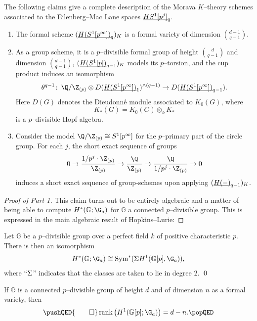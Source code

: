 \begin{theorem}\label{MainKThyOfEMSpacesTheorem}
The following claims give a complete description of the Morava \(K\)--theory schemes associated to the Eilenberg--Mac Lane spaces \(\OS{HS^1[p^j]}{q}\).
\begin{enumerate}
    \item The formal scheme \((\OS{H(S^1[p^\infty])}{q})_K\) is a formal variety of dimension \(\binom{d-1}{q-1}\).
    \item As a group scheme, it is a \(p\)--divisible formal group of height \(\binom{d}{q-1}\) and dimension \(\binom{d-1}{q-1}\), \((\OS{H(S^1[p])}{q-1})_K\) models its \(p\)--torsion, and the cup product induces an isomorphism \[\theta^{q-1}\co \Q / \Z_{(p)} \otimes D(\OS{H(S^1[p^\infty])}{1})^{\wedge (q-1)} \to D(\OS{H(S^1[p^\infty])}{q-1}).\]
          Here \(D(G)\) denotes the Dieudonn\'e module associated to \(K_0(G)\), where \[K_*(G) = K_0(G) \otimes_k K_*\] is a \(p\)--divisible Hopf algebra.
    \item Consider the model \(\Q / \Z_{(p)} \cong S^1[p^\infty]\) for the \(p\)--primary part of the circle group.
          For each \(j\), the short exact sequence of groups \[0 \to \frac{1/p^j \cdot \Z_{(p)}}{\Z_{(p)}} \to \frac{\Q}{\Z_{(p)}} \to \frac{\Q}{1/p^j \cdot \Z_{(p)}} \to 0\] induces a short exact sequence of group-schemes upon applying \((\OS{H(-)}{q-1})_K\).
\end{enumerate}
\end{theorem}
\begin{proof}[Proof of Part 1]\renewcommand{\qedsymbol}{\relax}
This claim turns out to be entirely algebraic and a matter of being able to compute \(H^*(\mathbb G; \G_a)\) for \(\mathbb G\) a connected \(p\)--divisible group.
This is expressed in the main algebraic result of Hopkins--Lurie:
\end{proof}

\begin{theorem}
Let \(\mathbb G\) be a \(p\)--divisible group over a perfect field \(k\) of positive characteristic \(p\).
There is then an isomorphism \[H^*(\mathbb G; \G_a) \cong \Sym^*(\Susp H^1(\mathbb G[p], \G_a)),\] where ``\(\Sigma\)'' indicates that the classes are taken to lie in degree \(2\). \qed
\end{theorem}

\begin{lemma}
If \(\mathbb G\) is a connected \(p\)--divisible group of height \(d\) and of dimension \(n\) as a formal variety, then
\[\pushQED{\qed}
\operatorname{rank}\left(H^1(\mathbb G[p]; \G_a)\right) = d - n. \qedhere
\popQED\]
\end{lemma}

